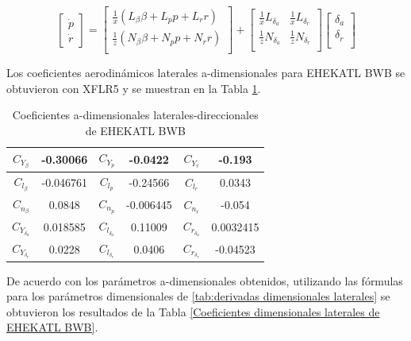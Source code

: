 \begin{equation}
    \begin{bmatrix}
        \dot p \\
        \dot r
    \end{bmatrix}
    =
    \begin{bmatrix}
        \frac{1}{x} (L_\beta \beta + L_p p + L_r r) \\
        \frac{1}{z} (N_\beta \beta + N_p p + N_r r) \\
    \end{bmatrix}
    +
    \begin{bmatrix}
      \frac{1}{x} L_{\delta_{a}} &  \frac{1}{x} L_{\delta_{r}} \\
      \frac{1}{z} N_{\delta_{a}} & \frac{1}{z} N_{\delta_{r}} \\
    \end{bmatrix}
    \begin{bmatrix}
        \delta_{a} \\
        \delta_{r} \\
    \end{bmatrix}
\end{equation}

Los coeficientes aerodinámicos laterales a-dimensionales para EHEKATL BWB se obtuvieron con XFLR5 y se muestran en la Tabla \ref{Coeficientes adimensionales laterales de EHEKATL BWB}. 
\begin{table}[!h]
    \centering
    \begin{tabular}{|cc|cc|cc|}
    \hline
     $C_{Y_\beta}$ & -0.30066 & $C_{Y_p}$ & -0.0422 & $C_{Y_r}$ & -0.193 \\
     \hline
     $C_{l_\beta}$ & -0.046761 & $C_{l_p}$ & -0.24566 & $C_{l_r}$ & 0.0343 \\
     \hline
     $C_{n_\beta}$ & 0.0848 & $C_{n_p}$ & -0.006445 & $C_{n_r}$ & -0.054 \\
     \hline
     $C_{Y_{\delta_a}}$ & 0.018585 & $C_{l_{\delta_a}}$ & 0.11009 & $C_{r_{\delta_a}}$ & 0.0032415 \\
     \hline
     $C_{Y_{\delta_r}}$ & 0.0228 & $C_{l_{\delta_r}}$ & 0.0406 & $C_{r_{\delta_r}}$ & -0.04523 \\
     \hline
    \end{tabular}
    \caption{Coeficientes a-dimensionales laterales-direccionales de EHEKATL BWB}
    \label{Coeficientes adimensionales laterales de EHEKATL BWB}
\end{table}

De acuerdo con los parámetros a-dimensionales obtenidos, utilizando las fórmulas para los parámetros dimensionales de \ref{tab:derivadas dimensionales laterales} se obtuvieron los resultados de la Tabla \ref{Coeficientes dimensionales laterales de EHEKATL BWB}.

